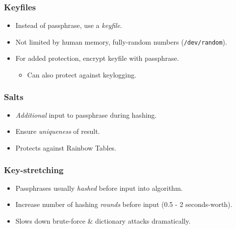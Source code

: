 \documentclass[xcolor={dvipsnames,svgnames},hyperref=dvips]{beamer}
\begin{document}
	\begin{frame}
		\frametitle{Keyfiles}
		\begin{itemize}
		\item Instead of passphrase, use a \textit{keyfile}.
		\item Not limited by human memory, fully-random numbers (\texttt{/dev/random}).
		\item For added protection, encrypt keyfile with passphrase.
			\begin{itemize}
			\item Can also protect against keylogging.
			\end{itemize}
		\end{itemize}
	\end{frame}

	\begin{frame}
		\frametitle{Salts}
		\begin{itemize}
		\item \textit{Additional} input to passphrase during hashing.
		\item Ensure \textit{uniqueness} of result.
		\item Protects against Rainbow Tables.
		\end{itemize}
	\end{frame}

	\begin{frame}
		\frametitle{Key-stretching}
		\begin{itemize}
		\item Passphrases usually \textit{hashed} before input into algorithm.
		\item Increase number of hashing \textit{rounds} before input (0.5 - 2 seconds-worth).
		\item Slows down brute-force \& dictionary attacks dramatically.
		\end{itemize}
	\end{frame}
\end{document}
